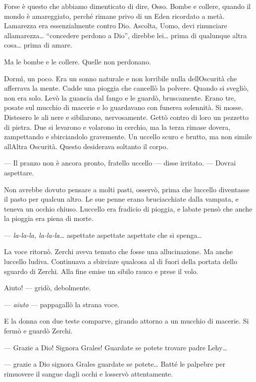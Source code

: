 Forse è questo che abbiamo dimenticato di dire, Osso. Bombe e collere,
quando il mondo è amareggiato, perché rimane privo di un Eden ricordato
a metà. L\textquotesingle amarezza era essenzialmente contro Dio.
Ascolta, Uomo, devi rinunciare all\textquotesingle amarezza\ldots{}
``concedere perdono a Dio'', direbbe lei\ldots{} prima di qualunque
altra cosa\ldots{} prima di amare.

Ma le bombe e le collere. Quelle non perdonano.

Dormì, un poco. Era un sonno naturale e non l\textquotesingle orribile
nulla dell\textquotesingle Oscurità che afferrava la mente. Cadde una
pioggia che cancellò la polvere. Quando si svegliò, non era solo. Levò
la guancia dal fango e le guardò, bruscamente. Erano tre, posate sul
mucchio di macerie e lo guardavano con funerea solennità. Si mosse.
Distesero le ali nere e sibilarono, nervosamente. Gettò contro di loro
un pezzetto di pietra. Due si levarono e volarono in cerchio, ma la
terza rimase dov\textquotesingle era, zampettando e sbirciandolo
gravemente. Un uccello scuro e brutto, ma non simile
all\textquotesingle Altra Oscurità. Questo desiderava soltanto il corpo.

--- Il pranzo non è ancora pronto, fratello uccello --- disse irritato.
--- Dovrai aspettare.

Non avrebbe dovuto pensare a molti pasti, osservò, prima che
l\textquotesingle uccello diventasse il pasto per qualcun altro. Le sue
penne erano bruciacchiate dalla vampata, e teneva un occhio chiuso.
L\textquotesingle uccello era fradicio di pioggia, e
l\textquotesingle abate pensò che anche la pioggia era piena di morte.

--- \emph{la-la-la, la-la-la\ldots{}} aspettate aspettate aspettate che
si spenga\ldots{}

La voce ritornò. Zerchi aveva temuto che fosse una allucinazione. Ma
anche l\textquotesingle uccello l\textquotesingle udiva. Continuava a
sbirciare qualcosa al di fuori della portata dello sguardo di Zerchi.
Alla fine emise un sibilo rauco e prese il volo.

Aiuto! --- gridò, debolmente.

--- \emph{aiuto} --- pappagallò la strana voce.

E la donna con due teste comparve, girando attorno a un mucchio di
macerie. Si fermò e guardò Zerchi.

--- Grazie a Dio! Signora Grales! Guardate se potete trovare padre
Lehy\ldots{}

--- grazie a Dio signora Grales guardate se potete\ldots{} Batté le
palpebre per rimuovere il sangue dagli occhi e l\textquotesingle osservò
attentamente.

